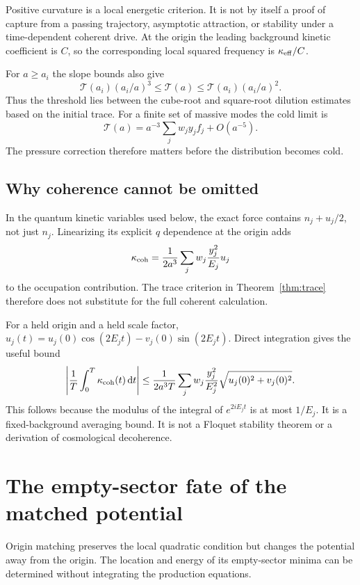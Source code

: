 \documentclass[11pt]{article}
\theoremstyle{definition}\newtheorem{definition}[theorem]{Definition}
\newcommand{\dd}{\mathrm d}\newcommand{\Tr}{\mathcal T}\newcommand{\Ezero}{E_0}
\begin{document}
Positive curvature is a local energetic criterion. It is not by itself a proof of capture from a passing trajectory, asymptotic attraction, or stability under a time-dependent coherent drive. At the origin the leading background kinetic coefficient is $C$, so the corresponding local squared frequency is $\kappa_{\rm eff}/C$.

For $a\ge a_i$ the slope bounds also give
\begin{equation}
\Tr(a_i)(a_i/a)^3\le\Tr(a)\le\Tr(a_i)(a_i/a)^2.
\end{equation}
Thus the threshold lies between the cube-root and square-root dilution estimates based on the initial trace. For a finite set of massive modes the cold limit is
\begin{equation}
\Tr(a)=a^{-3}\sum_jw_jy_jf_j+O(a^{-5}).\label{eq:cold}
\end{equation}
The pressure correction therefore matters before the distribution becomes cold.

\subsection{Why coherence cannot be omitted}
In the quantum kinetic variables used below, the exact force contains $n_j+u_j/2$, not just $n_j$. Linearizing its explicit $q$ dependence at the origin adds
\begin{equation}
\kappa_{\rm coh}=\frac{1}{2a^3}\sum_jw_j\frac{y_j^2}{E_j}u_j
\end{equation}
to the occupation contribution. The trace criterion in Theorem~\ref{thm:trace} therefore does not substitute for the full coherent calculation.

For a held origin and a held scale factor, $u_j(t)=u_j(0)\cos(2E_jt)-v_j(0)\sin(2E_jt)$. Direct integration gives the useful bound
\begin{equation}
\left|\frac1T\int_0^T\kappa_{\rm coh}(t)\,\dd t\right|
\le\frac{1}{2a^3T}\sum_jw_j\frac{y_j^2}{E_j^2}\sqrt{u_j(0)^2+v_j(0)^2}.
\end{equation}
This follows because the modulus of the integral of $e^{2iE_jt}$ is at most $1/E_j$. It is a fixed-background averaging bound. It is not a Floquet stability theorem or a derivation of cosmological decoherence.

\section{The empty-sector fate of the matched potential}
Origin matching preserves the local quadratic condition but changes the potential away from the origin. The location and energy of its empty-sector minima can be determined without integrating the production equations.
\end{document}
